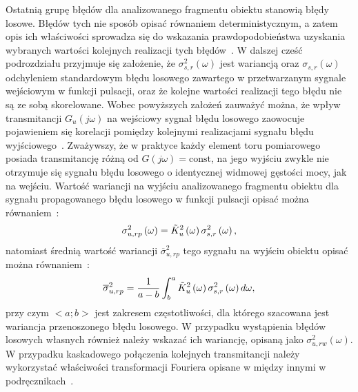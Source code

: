 Ostatnią grupę błędów dla analizowanego fragmentu obiektu stanowią błędy losowe. Błędów tych nie sposób opisać równaniem deterministycznym, a zatem opis ich właściwości sprowadza się do wskazania prawdopodobieństwa uzyskania wybranych wartości kolejnych realizacji tych błędów~\cite{jcgm_guide, jakubiec_system}. W dalszej cześć podrozdziału przyjmuje się założenie, że $\sigma_{s,r}^{2}(\omega)$ jest wariancją oraz $\sigma_{s,r}(\omega)$ odchyleniem standardowym błędu losowego zawartego w przetwarzanym sygnale wejściowym w funkcji pulsacji, oraz że kolejne wartości realizacji tego błędu nie są ze sobą skorelowane. Wobec powyższych założeń zauważyć można, że wpływ transmitancji $G_{u}(j\omega)$ na wejściowy sygnał błędu losowego zaowocuje pojawieniem się korelacji pomiędzy kolejnymi realizacjami sygnału błędu wyjściowego~\cite{jadziak_dsp, bibbona_filter, benassi_filter}. Zważywszy, że w praktyce każdy element toru pomiarowego posiada transmitancję różną od $G(j\omega) = \text{const}$, na jego wyjściu zwykle nie otrzymuje się sygnału błędu losowego o identycznej widmowej gęstości mocy, jak na wejściu. Wartość wariancji na wyjściu analizowanego fragmentu obiektu dla sygnału propagowanego błędu losowego w funkcji pulsacji opisać można równaniem~\cite{oppenheim_sns}:
\begin{equation}
\sigma_{u,rp}^{2} \left(\omega\right) = \tilde{K}_{u}^{2} \left(\omega\right) \sigma_{s,r}^{2} \left(\omega\right) \label{eq:mid_cont_var_omega},
\end{equation}
natomiast średnią wartość wariancji $\overline{\sigma}_{u,rp}^{2}$ tego sygnału na wyjściu obiektu opisać można równaniem~\cite{jadziak_dsp, proakis_dsp}:
\begin{equation}
\overline{\sigma}_{u,rp}^{2} = \frac{1}{a - b} \int _{b} ^{a} \tilde{K}_{u}^{2} \left(\omega\right) \sigma_{s,r}^{2} \left(\omega\right) d\omega \label{eq:mid_cont_var_rand},
\end{equation}
przy czym $<a;b>$ jest zakresem częstotliwości, dla którego szacowana jest wariancja przenoszonego błędu losowego. W przypadku wystąpienia błędów losowych własnych również należy wskazać ich wariancję, opisaną jako $\sigma_{u,rw}^{2}(\omega)$. W przypadku kaskadowego połączenia kolejnych transmitancji należy wykorzystać właściwości transformacji Fouriera opisane w między innymi w podręcznikach~\cite{proakis_dsp, oppenheim_sns, oppenheim_dsp}.

